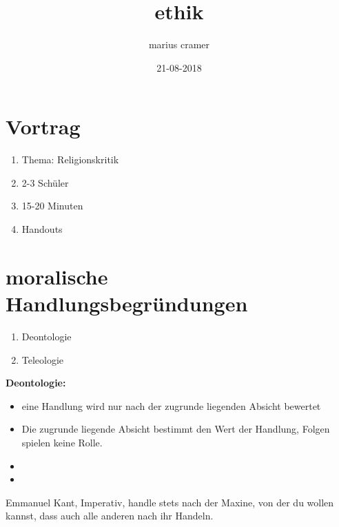 \documentclass{article}
\title{ethik}
\author{marius cramer}
\date{21-08-2018}
\begin{document}
\maketitle

\tableofcontents

\newpage

\section{Vortrag}
\begin{enumerate}
  \item Thema: Religionskritik
  \item 2-3 Schüler
  \item 15-20 Minuten
  \item Handouts
\end{enumerate}

\section{moralische Handlungsbegründungen}
\begin{enumerate}
  \item Deontologie
  \item Teleologie
\end{enumerate}
\textbf{Deontologie:}
\begin{itemize}
  \item eine Handlung wird nur nach der zugrunde liegenden Absicht bewertet
  \item Die zugrunde liegende Absicht bestimmt den Wert der Handlung, Folgen spielen keine Rolle.
\end{itemize}

\bigskip

\begin{itemize}
  \item
  \item
\end{itemize}

\bigskip

Emmanuel Kant, Imperativ, handle stets nach der Maxine, von der du wollen kannst, dass auch alle anderen nach ihr Handeln.
\end{document}

